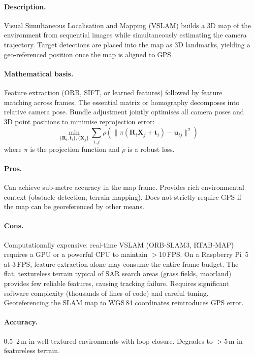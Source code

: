 \paragraph{Description.}
Visual Simultaneous Localisation and Mapping (VSLAM) builds a 3D map of the environment from sequential images while simultaneously estimating the camera trajectory.  Target detections are placed into the map as 3D landmarks, yielding a geo-referenced position once the map is aligned to GPS.

\paragraph{Mathematical basis.}
Feature extraction (ORB, SIFT, or learned features) followed by feature matching across frames.  The essential matrix or homography decomposes into relative camera pose.  Bundle adjustment jointly optimises all camera poses and 3D point positions to minimise reprojection error:
\begin{equation}
  \min_{\{\mathbf{R}_i, \mathbf{t}_i\}, \{\mathbf{X}_j\}} \sum_{i,j} \rho\!\left(\| \pi(\mathbf{R}_i \mathbf{X}_j + \mathbf{t}_i) - \mathbf{u}_{ij} \|^2 \right)
\end{equation}
where $\pi$ is the projection function and $\rho$ is a robust loss.

\paragraph{Pros.}
Can achieve sub-metre accuracy in the map frame.  Provides rich environmental context (obstacle detection, terrain mapping).  Does not strictly require GPS if the map can be georeferenced by other means.

\paragraph{Cons.}
Computationally expensive: real-time VSLAM (ORB-SLAM3, RTAB-MAP) requires a GPU or a powerful CPU to maintain $>$10\,FPS.  On a Raspberry Pi~5 at 3\,FPS, feature extraction alone may consume the entire frame budget.  The flat, textureless terrain typical of SAR search areas (grass fields, moorland) provides few reliable features, causing tracking failure.  Requires significant software complexity (thousands of lines of code) and careful tuning.  Georeferencing the SLAM map to WGS\,84 coordinates reintroduces GPS error.

\paragraph{Accuracy.}  0.5--2\,m in well-textured environments with loop closure.  Degrades to $>$5\,m in featureless terrain.

